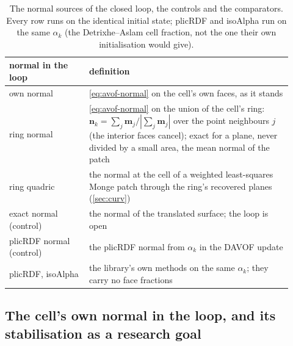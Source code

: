 \documentclass[preprint,12pt]{elsarticle}
\begin{document}
\begin{table}[htbp]
\centering
\caption{The normal sources of the closed loop, the controls and the comparators. Every row runs on the identical initial state; plicRDF and isoAlpha run on the same $\alpha_k$ (the Detrixhe--Aslam cell fraction, not the one their own initialisation would give).}
\label{tab:tpf-sources}
\footnotesize
\begin{tabular}{p{0.26\linewidth}p{0.66\linewidth}}
\toprule
normal in the loop & definition \\
\midrule
own normal & \cref{eq:avof-normal} on the cell's own faces, as it stands \\
ring normal & \cref{eq:avof-normal} on the union of the cell's ring: $\mathbf{n}_k = \sum_j \mathbf{m}_j / |\sum_j \mathbf{m}_j|$ over the point neighbours $j$ (the interior faces cancel); exact for a plane, never divided by a small area, the mean normal of the patch \\
ring quadric & the normal at the cell of a weighted least-squares Monge patch through the ring's recovered planes (\cref{sec:curv}) \\
exact normal (control) & the normal of the translated surface; the loop is open \\
plicRDF normal (control) & the plicRDF normal from $\alpha_k$ in the DAVOF update \\
\midrule
plicRDF, isoAlpha & the library's own methods on the same $\alpha_k$; they carry no face fractions \\
\bottomrule
\end{tabular}
\end{table}

\subsection{The cell's own normal in the loop, and its stabilisation as a research goal}
\label{sec:tpf-sliver}
\end{document}
